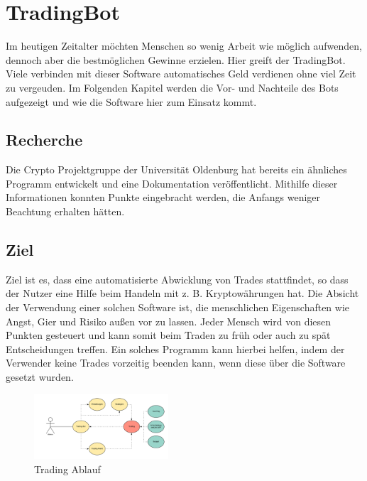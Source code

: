 
\section{TradingBot}
Im heutigen Zeitalter möchten Menschen so wenig Arbeit wie möglich aufwenden, dennoch aber die bestmöglichen Gewinne erzielen. Hier greift der TradingBot. Viele verbinden mit dieser Software automatisches Geld verdienen ohne viel Zeit zu vergeuden. Im Folgenden Kapitel werden die Vor- und Nachteile des Bots aufgezeigt und wie die Software hier zum Einsatz kommt. 

\subsection{Recherche}
Die Crypto Projektgruppe der Universität Oldenburg hat bereits ein ähnliches Programm entwickelt und eine Dokumentation veröffentlicht. Mithilfe dieser Informationen konnten Punkte eingebracht werden, die Anfangs weniger Beachtung erhalten hätten.\cite{deepCrypto}

\subsection{Ziel}
Ziel ist es, dass eine automatisierte Abwicklung von Trades stattfindet, so dass der Nutzer eine Hilfe beim Handeln mit z. B. Kryptowährungen hat. Die Absicht der Verwendung einer solchen Software ist, die menschlichen Eigenschaften wie Angst, Gier und Risiko außen vor zu lassen. Jeder Mensch wird von diesen Punkten gesteuert und kann somit beim Traden zu früh oder auch zu spät Entscheidungen treffen. Ein solches Programm kann hierbei helfen, indem der Verwender keine Trades vorzeitig beenden kann, wenn diese über die Software gesetzt wurden.
\begin{figure}[ht]
\includegraphics[width=5cm]{bot/trading_diagramm}
\caption{Trading Ablauf}
\label{Trading_Diagramm}
\end{figure}

